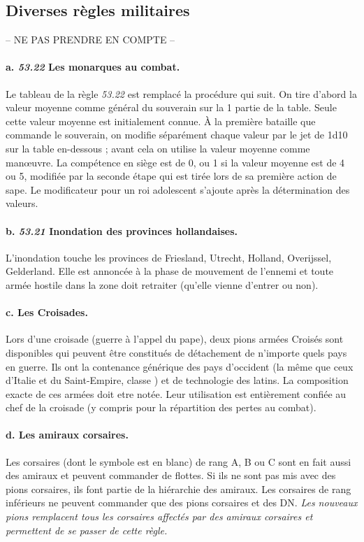  
\subsection{Diverses règles militaires}
-- NE PAS PRENDRE EN COMPTE --


\paragraph{a. \textit{53.22} Les monarques au combat.}

Le tableau de la règle \textit{53.22} est remplacé la procédure
qui suit. On tire d'abord la valeur moyenne comme général du souverain
sur la 1 partie de la table. Seule cette valeur moyenne est initialement
connue. À la première bataille que commande le souverain, on modifie 
séparément chaque valeur
par le jet de 1d10 sur la table en-dessous ; avant cela on utilise
la valeur moyenne comme man{\oe}uvre.  
La compétence en siège est de 0, ou 1 si la valeur moyenne est de 4 ou 5, modifiée par 
la seconde étape qui est tirée lors de sa première action de sape. 
Le modificateur pour un roi adolescent s'ajoute après la détermination des valeurs. 

\paragraph{b. \textit{53.21} Inondation des provinces hollandaises.}
L'inondation touche les provinces de Friesland, Utrecht, Holland,
Overijssel, Gelderland. 
Elle est annoncée à la phase de mouvement de l'ennemi et toute armée hostile
dans la zone doit retraiter (qu'elle vienne d'entrer ou non).


\paragraph{c. Les Croisades.}
Lors d'une croisade (guerre à l'appel du pape), deux pions armées Croisés
sont disponibles qui peuvent être constitués de détachement de n'importe
quels pays en guerre. Ils ont la contenance générique des pays d'occident (la
même que ceux d'Italie et du Saint-Empire, classe \CAIII) et de technologie
des latins.
La composition exacte de ces armées doit etre notée. Leur utilisation est
entièrement confiée au chef de la croisade (y compris pour la
répartition des pertes au combat).

\paragraph{d. Les amiraux corsaires.}
Les corsaires (dont le symbole est en blanc) de rang A, B ou C
sont en fait aussi des amiraux et peuvent commander de flottes.
Si ils ne sont pas mis avec
des pions corsaires, ils font partie de la hiérarchie des amiraux.
Les corsaires de rang inférieurs ne peuvent commander que des
pions corsaires et des DN.
\textit{Les nouveaux pions remplacent tous les corsaires affectés
par des amiraux corsaires et permettent de se passer de cette règle.}

